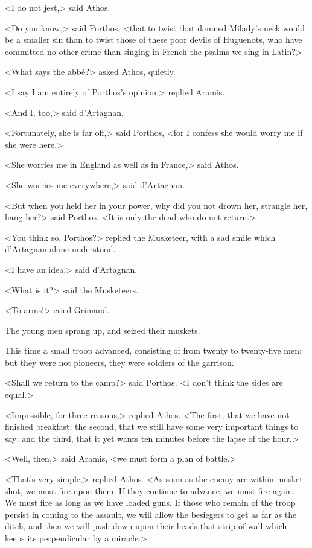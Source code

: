 <I do not jest,> said Athos. 

<Do you know,> said Porthos, <that to twist that damned Milady's neck would be a smaller sin than to twist those of these poor devils of Huguenots, who have committed no other crime than singing in French the psalms we sing in Latin?> 

<What says the abbé?> asked Athos, quietly. 

<I say I am entirely of Porthos's opinion,> replied Aramis. 

<And I, too,> said d'Artagnan. 

<Fortunately, she is far off,> said Porthos, <for I confess she would worry me if she were here.> 

<She worries me in England as well as in France,> said Athos. 

<She worries me everywhere,> said d'Artagnan. 

<But when you held her in your power, why did you not drown her, strangle her, hang her?> said Porthos. <It is only the dead who do not return.> 

<You think so, Porthos?> replied the Musketeer, with a sad smile which d'Artagnan alone understood. 

<I have an idea,> said d'Artagnan. 

<What is it?> said the Musketeers. 

<To arms!> cried Grimaud. 

The young men sprang up, and seized their muskets. 

This time a small troop advanced, consisting of from twenty to twenty-five men; but they were not pioneers, they were soldiers of the garrison. 

<Shall we return to the camp?> said Porthos. <I don't think the sides are equal.> 

<Impossible, for three reasons,> replied Athos. <The first, that we have not finished breakfast; the second, that we still have some very important things to say; and the third, that it yet wants ten minutes before the lapse of the hour.> 

<Well, then,> said Aramis, <we must form a plan of battle.> 

<That's very simple,> replied Athos. <As soon as the enemy are within musket shot, we must fire upon them. If they continue to advance, we must fire again. We must fire as long as we have loaded guns. If those who remain of the troop persist in coming to the assault, we will allow the besiegers to get as far as the ditch, and then we will push down upon their heads that strip of wall which keeps its perpendicular by a miracle.> 

